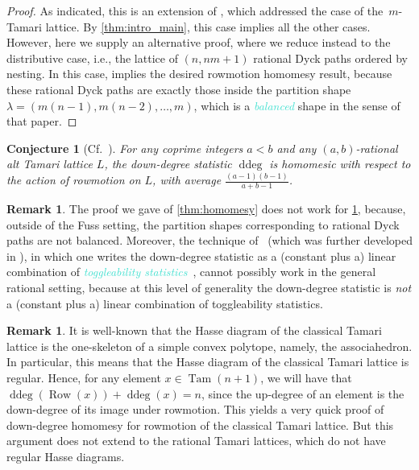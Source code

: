 \documentclass[11pt]{amsart}
\newcommand{\Tam}[1]{\operatorname{Tam}({#1})}
\DeclareMathOperator{\row}{Row}
\DeclareMathOperator{\ddeg}{ddeg}
\newcommand{\dfn}[1]{\textcolor{Turquoise}{\emph{#1}}}
\newtheorem{conjecture}[theorem]{Conjecture}
\theoremstyle{definition}
\newtheorem{remark}[theorem]{Remark}
\begin{document}
\begin{proof}
As indicated, this is an extension of \cite[Theorem 5.14]{defant2024tamari}, which addressed the case of the~$m$-Tamari lattice. By \cref{thm:intro_main}, this case implies all the other cases. However, here we supply an alternative proof, where we reduce instead to the distributive case, i.e., the lattice of $(n,nm+1)$ rational Dyck paths ordered by nesting. In this case, \cite[Corollary 3.11]{chan2017expected} implies the desired rowmotion homomesy result, because these rational Dyck paths are exactly those inside the partition shape $\lambda=(m(n-1),m(n-2),\ldots,m)$, which is a \dfn{balanced} shape in the sense of that paper.
\end{proof}

\begin{conjecture}[{Cf.~\cite[Conjecture 5.16]{defant2024tamari}}] \label{conj:homomesy}
For any coprime integers $a<b$ and any $(a,b)$-rational alt Tamari lattice $L$, the down-degree statistic $\ddeg$ is homomesic with respect to the action of rowmotion on $L$, with average $\frac{(a-1)(b-1)}{a+b-1}$.
\end{conjecture}

\begin{remark}
The proof we gave of \cref{thm:homomesy} does not work for \cref{conj:homomesy}, because, outside of the Fuss setting, the partition shapes corresponding to rational Dyck paths are not balanced. Moreover, the technique of~\cite{chan2017expected} (which was further developed in \cite{defant2023homomesy}), in which one writes the down-degree statistic as a (constant plus a) linear combination of \dfn{toggleability statistics}~\cite{striker2015tog}, cannot possibly work in the general rational setting, because at this level of generality the down-degree statistic is \emph{not} a (constant plus a) linear combination of toggleability statistics.
\end{remark}

\begin{remark}
It is well-known that the Hasse diagram of the classical Tamari lattice is the one-skeleton of a simple convex polytope, namely, the associahedron. In particular, this means that the Hasse diagram of the classical Tamari lattice is regular. Hence, for any element $x\in \Tam{n+1}$, we will have that $\ddeg(\row(x))+\ddeg(x)=n$, since the up-degree of an element is the down-degree of its image under rowmotion. This yields a very quick proof of down-degree homomesy for rowmotion of the classical Tamari lattice. But this argument does not extend to the rational Tamari lattices, which do not have regular Hasse diagrams.
\end{remark}
\end{document}
